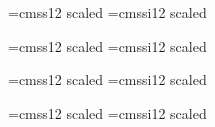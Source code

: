 \font\mtxfrtsf=cmss12 scaled 
\font\mtxfrtsi=cmssi12 scaled 

\font\mtxsvtsf=cmss12 scaled 
\font\mtxsvtsi=cmssi12 scaled 

\font\mtxtwtysf=cmss12 scaled 
\font\mtxtwtysi=cmssi12 scaled 

\font\mtxtwfvsf=cmss12 scaled 
\font\mtxtwfvsi=cmssi12 scaled 

\def\mtxPalatino{
  
  \def\bigtype{\bigfont\bf}
  \def\Bigtype{\Bigfont\bf}
  \def\BIgtype{\BIgfont\bf}
  \def\BIGtype{\BIGfont\bf}
  \elevenrm
}

\def\mtxTimes{
  
  \def\bigtype{\bigfont\bf}
  \def\Bigtype{\Bigfont\bf}
  \def\BIgtype{\BIgfont\bf}
  \def\BIGtype{\BIGfont\bf}
  \elevenrm
}

\def\mtxHelvetica{
  \font\mtxeightsf=phvr8t at 8pt
  \font\mtxtensf=phvr8t at 10pt
  \font\mtxelevensf=phvr8t at 11pt
  \font\mtxtwelvesf=phvr8t at 12pt

  \font\mtxfrtsf=phvr8t scaled \magstep2
  \font\mtxfrtsi=phvro8t scaled \magstep2 

  \font\mtxsvtsf=phvr8t scaled \magstep3
  \font\mtxsvtsi=phvro8t scaled \magstep3

  \font\mtxtwtysf=phvr8t scaled \magstep4
  \font\mtxtwtysi=phvro8t scaled \magstep4

  \font\mtxtwfvsf=phvr8t scaled \magstep5
  \font\mtxtwfvsi=phvro8t scaled \magstep5
}

\def\mtxAllsf{
  \def\bigtype{
     \let\rm\mtxfrtsf
     \let\it\mtxfrtsi
     \rm
   }
  \def\Bigtype{
     \let\rm\mtxsvtsf
     \let\it\mtxsvtsi
     \rm
   }
  \def\BIgtype{
     \let\rm\mtxtwtysf
     \let\it\mtxtwtysi
     \rm
   }
  \def\BIGtype{
     \let\rm\mtxtwfvsf
     \let\it\mtxtwfvsi
     \rm
   }
  \mtxelevensf
}


\def\mtxInstrfont{\twelvebf}



\def\mtxTinySize{\tinyvalue}
\def\mtxSmallSize{\smallvalue}
\def\mtxNormalSize{\normalvalue}
\def\mtxLargeSize{\largevalue}
\def\mtxHugeSize{\Largevalue}


\def\mtxAt#1{\lyrraisehere{#1\internote}}%

